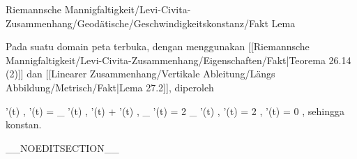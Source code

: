 {Riemannsche Mannigfaltigkeit/Levi-Civita-Zusammenhang/Geodätische/Geschwindigkeitskonstanz/Fakt}
{Lema}
{}
{

\faktzusatz {}
\faktzusatz {}

}
{

Pada suatu domain peta terbuka, dengan menggunakan
[[Riemannsche Mannigfaltigkeit/Levi-Civita-Zusammenhang/Eigenschaften/Fakt|Teorema 26.14  (2)]]
dan
[[Linearer Zusammenhang/Vertikale Ableitung/Längs Abbildung/Metrisch/Fakt|Lema 27.2]],
diperoleh

\mavergleichskettealign
{\vergleichskettealign
{ {  }  \left\langle  \gamma'(t) ,  \gamma'(t)  \right\rangle
}
{ =} { \left\langle \nabla_{ {  }  }\gamma'(t) ,  \gamma'(t)  \right\rangle + \left\langle  \gamma'(t) , \nabla_{  {  }  }\gamma'(t)  \right\rangle
}
{ =} { 2 \left\langle \nabla_{ {  }  }\gamma'(t) ,  \gamma'(t)  \right\rangle
}
{ =} { 2 \left{}  ,  \gamma'(t)  \right\rangle
}
{ =} { 0
}
}
{}
{}{,}
sehingga
 konstan.

}

__NOEDITSECTION__

